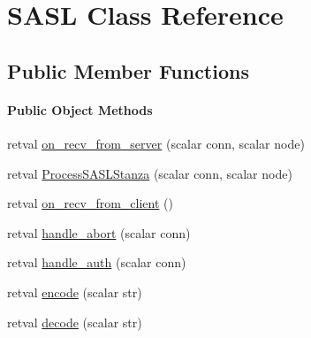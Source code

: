 \hypertarget{class_d_jabberd_1_1_stanza_1_1_s_a_s_l}{
\section{\-S\-A\-S\-L \-Class \-Reference}
\label{class_d_jabberd_1_1_stanza_1_1_s_a_s_l}
}
\subsection*{\-Public \-Member \-Functions}
\begin{Indent}\paragraph*{\-Public \-Object \-Methods}
\begin{DoxyCompactItemize}
\item 
retval \hyperlink{class_d_jabberd_1_1_stanza_1_1_s_a_s_l_a4c2894a0594af88a6299d223a62acbb6}{on\-\_\-recv\-\_\-from\-\_\-server} (scalar conn, scalar node)
\item 
retval \hyperlink{class_d_jabberd_1_1_stanza_1_1_s_a_s_l_a1b41538c129f1d05b71db8e8cc1a9d56}{\-Process\-S\-A\-S\-L\-Stanza} (scalar conn, scalar node)
\item 
retval \hyperlink{class_d_jabberd_1_1_stanza_1_1_s_a_s_l_af5ca5038bf1ee2f1fadfc05ea21f588c}{on\-\_\-recv\-\_\-from\-\_\-client} ()
\item 
retval \hyperlink{class_d_jabberd_1_1_stanza_1_1_s_a_s_l_a7b5d52b4f1b47718f9dc4ad77a39a5de}{handle\-\_\-abort} (scalar conn)
\item 
retval \hyperlink{class_d_jabberd_1_1_stanza_1_1_s_a_s_l_a96c3bc7b29a341199ef935d06bc370da}{handle\-\_\-auth} (scalar conn)
\item 
retval \hyperlink{class_d_jabberd_1_1_stanza_1_1_s_a_s_l_a07a2204980fe1b5ce7d88805118315e5}{encode} (scalar str)
\item 
retval \hyperlink{class_d_jabberd_1_1_stanza_1_1_s_a_s_l_a6dbed5f9d959f77fdf7d040191374e48}{decode} (scalar str)
\end{DoxyCompactItemize}
\end{Indent}
